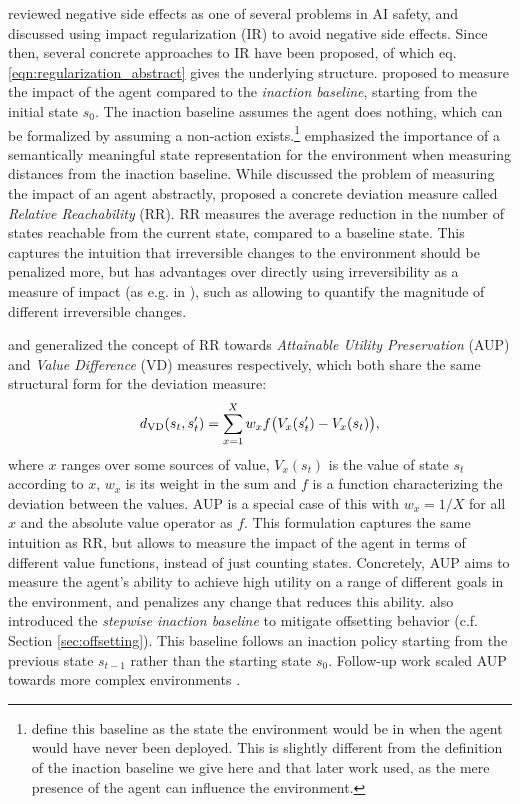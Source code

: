 \documentclass[letterpaper]{article} %
\begin{document}
\citet{amodei2016concrete} reviewed negative side effects as one of several problems in AI safety, and discussed using impact regularization (IR) to avoid negative side effects.
Since then, several concrete approaches to IR have been proposed, of which eq. \eqref{eqn:regularization_abstract} gives the underlying structure. \citet{armstrong2017low} proposed to measure the impact of the agent compared to the \textit{inaction baseline}, starting from the initial state $s_0$. The inaction baseline assumes the agent does nothing, which can be formalized by assuming a non-action exists.\footnote{\citet{armstrong2017low} define this baseline as the state the environment would be in when the agent would have never been deployed. This is slightly different from the definition of the inaction baseline we give here and that later work used, as the mere presence of the agent can influence the environment.} \citet{armstrong2017low} emphasized the importance of a semantically meaningful state representation for the environment when measuring distances from the inaction baseline.
While \citet{armstrong2017low} discussed the problem of measuring the impact of an agent abstractly, \citet{krakovna2018penalizing} proposed a concrete deviation measure called \textit{Relative Reachability} (RR). RR measures the average reduction in the number of states reachable from the current state, compared to a baseline state. This captures the intuition that irreversible changes to the environment should be penalized more, but has advantages over directly using irreversibility as a measure of impact (as e.g. in \citet{eysenbach2017leave}), such as allowing to quantify the magnitude of different irreversible changes.

\citet{turner2020conservative} and \citet{krakovna2018penalizing} generalized the concept of RR towards \textit{Attainable Utility Preservation} (AUP) and \textit{Value Difference} (VD) measures respectively, which both share the same structural form for the deviation measure:
\begin{align}\label{eq:value differences}
    d_{\textnormal{VD}}(s_t, s'_t) = \sum_{x=1}^{X} w_x f\big(V_x(s'_t) - V_x(s_t)\big),
\end{align}
where $x$ ranges over some sources of value, $V_x(s_t)$ is the value of state $s_t$ according to $x$, $w_x$ is its weight in the sum and $f$ is a function characterizing the deviation between the values. AUP is a special case of this with $w_x=1/X$ for all $x$ and the absolute value operator as $f$. This formulation captures the same intuition as RR, but allows to measure the impact of the agent in terms of different value functions, instead of just counting states. Concretely, AUP aims to measure the agent's ability to achieve high utility on a range of different goals in the environment, and penalizes any change that reduces this ability.
\citet{turner2020conservative} also introduced the \textit{stepwise inaction baseline} to mitigate offsetting behavior (c.f. Section \ref{sec:offsetting}). This baseline follows an inaction policy starting from the previous state $s_{t-1}$ rather than the starting state $s_0$. Follow-up work scaled AUP towards more complex environments \citep{turner2020avoiding}.
\end{document}
